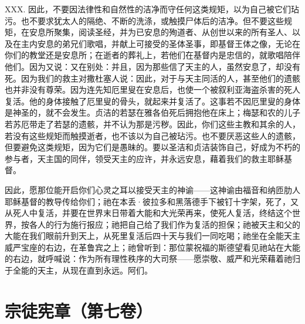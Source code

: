 XXX. 因此，不要因法律性和自然性的洁净而守任何这类规矩，以为自己被它们玷污。也不要求犹太人的隔绝、不断的洗涤，或触摸尸体后的洁净。但不要这些规矩，在安息所聚集，阅读圣经，并为已安息的殉道者、从创世以来的所有圣人、以及在主内安息的弟兄们歌唱，并献上可接受的圣体圣事，即基督王体之像，无论在你们的教堂还是安息所；在逝者的葬礼上，若他们在基督内是忠信的，就歌唱陪伴他们。因为又说：又在别处：并且，因为那些信了天主的人，虽然安息了，却没有死。因为我们的救主对撒杜塞人说：因此，对于与天主同活的人，甚至他们的遗骸也并非没有尊荣。因为连先知厄里叟在安息后，也使一个被叙利亚海盗杀害的死人复活。他的身体接触了厄里叟的骨头，就起来并复活了。这事若不因厄里叟的身体是神圣的，就不会发生。贞洁的若瑟在雅各伯死后拥抱他在床上；梅瑟和农的儿子若苏厄带走了若瑟的遗骸，并不认为那是污秽。因此，你们这些主教和其余的人，若没有这些规矩而触摸逝者，也不该以为自己被玷污。也不要厌恶这些人的遗骸，但要避免这类规矩，因为它们是愚昧的。要以圣洁和贞洁装饰自己，好成为不朽的参与者，天主国的同伴，领受天主的应许，并永远安息，藉着我们的救主耶稣基督。\par

因此，愿那位能开启你们心灵之耳以接受天主的神谕——这神谕由福音和纳匝肋人耶稣基督的教导传给你们；祂在本丢·彼拉多和黑落德手下被钉十字架，死了，又从死人中复活，并要在世界末日带着大能和大光荣再来，使死人复活，终结这个世界，按各人的行为施行报应；祂把自己给了我们作为复活的担保；祂被天主和父的大能在我们眼前升到天上，从死里复活后四十天与我们一同吃喝；祂坐在全能天主威严宝座的右边，在革鲁宾之上；祂曾听到：那位蒙祝福的斯德望看见祂站在大能的右边，就呼喊说：作为所有理性秩序的大司祭——愿崇敬、威严和光荣藉着祂归于全能的天主，从现在直到永远。阿们。\par



\section{宗徒宪章（第七卷）}


